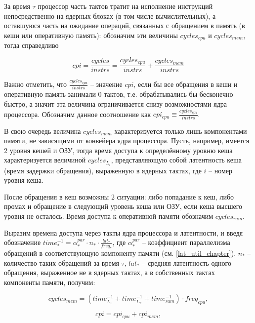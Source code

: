     За время $\tau$ процессор часть тактов тратит на исполнение инструкций непосредственно на
    ядерных блоках (в том числе вычислительных), а оставшуюся часть на ожидание операций,
    связанных с обращением в память (в кеши или оперативную память): обозначим эти величины
    $cycles_{cpu}$ и $cycles_{mem}$, тогда справедливо

    \begin{equation}
        cpi = \frac{cycles}{instrs} = \frac{cycles_{cpu}}{instrs} + \frac{cycles_{mem}}{instrs}
    \end{equation}

    Важно отметить, что $\frac{cycles_{cpu}}{instrs}$ -- значение $cpi$, если бы все обращения
    в кеши и оперативную память занимали 0 тактов, т.е. обрабатывались бы бесконечно быстро, а значит
    эта величина ограничивается снизу возможностями ядра процессора. Обозначим данное соотношение
    как $cpi_{cpu} \equiv \frac{cycles_{cpu}}{instrs}$.

    В свою очередь величина $cycles_{mem}$ характеризуется только лишь компонентами памяти,
    не зависящими от конвейера ядра процессора. Пусть, например, имеется 2 уровня кешей
    и ОЗУ, тогда время доступа к определённому уровню кеша характеризуется величиной $cycles_{L_{i}}$,
    представляющую собой латентность кеша (время задержки обращения), выраженную в ядерных тактах,
    где $i$ -- номер уровня кеша.

    После обращения в кеш возможны 2 ситуации: либо попадание к кеш, либо промах и обращение в
    следующий уровень кеша или ОЗУ, если кеша высшего уровня не осталось.
    Время доступа к оперативной памяти обозначим $cycles_{ram}$.

    Выразим времена доступа через такты ядра процессора и латентности, и введя обозначение
    $time^{-1}_{*} = \alpha_{*}^{par} \cdot n_{*} \cdot \frac{lat_{*}}{freq_{*}}$, где
    $\alpha_{*}^{par}$ --
    коэффициент параллелизма обращений в соответствующую компоненту памяти (см. \ref{lat_util_chapter}),
    $n_{*}$ -- количество таких обращений за время $\tau$, $lat_{*}$ -- средняя латентность
    одного обращения, выраженное не в ядерных тактах, а в собственных тактах компоненты памяти, получим:

    \begin{equation}
        cycles_{mem} = \left( time^{-1}_{L_1} + time^{-1}_{L_2} + time^{-1}_{ram} \right) \cdot freq_{cpu},
    \end{equation}

    \begin{equation}
        cpi = cpi_{cpu} + cpi_{mem},
    \end{equation}

